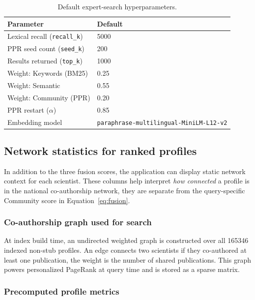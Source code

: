 \documentclass{article}
\begin{document}
\begin{table}[htbp]
  \centering
  \caption{Default expert-search hyperparameters.}
  \label{tab:search-hyperparams}
  \begin{tabular}{@{}ll@{}}
    \toprule
    Parameter & Default \\
    \midrule
    Lexical recall (\texttt{recall\_k}) & \num{5000} \\
    PPR seed count (\texttt{seed\_k}) & \num{200} \\
    Results returned (\texttt{top\_k}) & \num{1000} \\
    Weight: Keywords (BM25) & \num{0.25} \\
    Weight: Semantic & \num{0.55} \\
    Weight: Community (PPR) & \num{0.20} \\
    PPR restart ($\alpha$) & \num{0.85} \\
    Embedding model & \texttt{paraphrase-multilingual-MiniLM-L12-v2} \\
    \bottomrule
  \end{tabular}
\end{table}

\subsection{Network statistics for ranked profiles}

In addition to the three fusion scores, the application can display static network context for each scientist. These columns help interpret \emph{how connected} a profile is in the national co-authorship network, they are separate from the query-specific Community score in Equation~\eqref{eq:fusion}.

\subsubsection{Co-authorship graph used for search}

At index build time, an undirected weighted graph is constructed over all \num{165346} indexed non-stub profiles. An edge connects two scientists if they co-authored at least one publication, the weight is the number of shared publications. This graph powers personalized PageRank at query time and is stored as a sparse matrix.

\subsubsection{Precomputed profile metrics}
\end{document}

